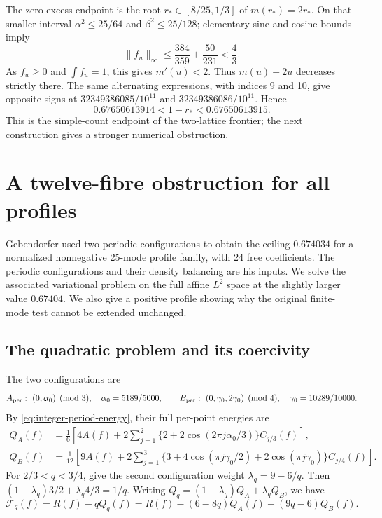 \documentclass[11pt,reqno]{amsart}
\numberwithin{equation}{section}
\begin{document}
The zero-excess endpoint is the root $r_*\in[8/25,1/3]$
of $m(r_*)=2r_*$. On that smaller interval
$\alpha^2\le25/64$ and $\beta^2\le25/128$; elementary sine and
cosine bounds imply
\[
 \|f_u\|_\infty\le\frac{384}{359}+\frac{50}{231}<\frac43.
\]
As $f_u\ge0$ and $\int f_u=1$, this gives $m'(u)<2$.
Thus $m(u)-2u$ decreases strictly there.
The same alternating expressions, with indices 9 and 10, give
opposite signs at $32349386085/10^{11}$ and
$32349386086/10^{11}$. Hence
\[
 0.67650613914<1-r_*<0.67650613915.
\]
This is the simple-count endpoint of the two-lattice frontier;
the next construction gives a stronger numerical obstruction.

\section{A twelve-fibre obstruction for all profiles}
\label{sec:twelve-fibre}

Gebendorfer \cite[Theorem 1.2 and Sections 5--6]{GebendorferCap}
used two periodic configurations to obtain the ceiling $0.674034$
for a normalized nonnegative 25-mode profile family, with 24 free
coefficients. The periodic configurations and their density
balancing are his inputs. We solve the associated variational
problem on the full affine $L^2$ space at the slightly larger value
$0.67404$. We also give a positive profile showing why the
original finite-mode test cannot be extended unchanged.

\subsection{The quadratic problem and its coercivity}

The two configurations are
\[
 A_{\rm per}:\ (0,\alpha_0)\pmod3,\quad \alpha_0=5189/5000,
 \qquad
 B_{\rm per}:\ (0,\gamma_0,2\gamma_0)\pmod4,\quad
 \gamma_0=10289/10000.
\]
By \eqref{eq:integer-period-energy}, their full per-point energies are
\begin{equation}
 \begin{split}
 Q_A(f)&=\frac16\left[4A(f)+2\sum_{j=1}^2
 \{2+2\cos(2\pi j\alpha_0/3)\}C_{j/3}(f)\right],\\
 Q_B(f)&=\frac1{12}\left[9A(f)+2\sum_{j=1}^3
 \{3+4\cos(\pi j\gamma_0/2)+2\cos(\pi j\gamma_0)\}
 C_{j/4}(f)\right].
 \end{split}
 \label{eq:twelve-periodic-energies}
\end{equation}
For $2/3<q<3/4$, give the second configuration weight
$\lambda_q=9-6/q$. Then
$(1-\lambda_q)3/2+\lambda_q4/3=1/q$.
Writing $Q_q=(1-\lambda_q)Q_A+\lambda_qQ_B$, we have
\begin{equation}
 \mathcal F_q(f)=R(f)-qQ_q(f)
 =R(f)-(6-8q)Q_A(f)-(9q-6)Q_B(f).
 \label{eq:twelve-form}
\end{equation}
\end{document}
